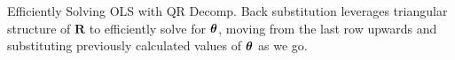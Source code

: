 \documentclass[11pt,compress,t,notes=noshow, xcolor=table]{beamer}
\begin{document}
\begin{vbframe}{Efficiently Solving OLS with QR Decomp.}
Back substitution leverages triangular structure of $\bm{R}$ to efficiently solve for $\bm{\theta}$, moving from the last row upwards and substituting previously calculated values of $\bm{\theta}$ as we go.

\end{vbframe}

\end{document}
